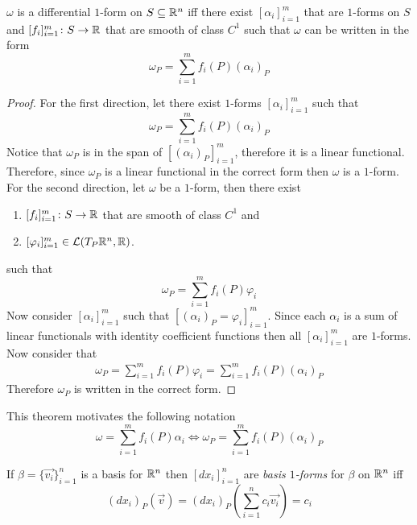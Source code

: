 \documentclass[notes.tex]{subfiles}
\begin{document}
\begin{theorem} \label{forms_are_sum_of_forms}
    $\omega$ is a differential $1$-form on $S \subseteq \mathbb{R}^n$ iff there exist $[\alpha_i]_{i = 1}^m$ that are $1$-forms on $S$ and $[f_i]_{i = 1}^m\colon S \to \mathbb{R}$ that are smooth of class $C^1$ such that $\omega$ can be written in the form
    \[
        \omega_P = \sum_{i = 1}^m f_i(P)(\alpha_i)_P
    \]
\end{theorem}
\begin{proof}
    For the first direction, let there exist $1$-forms $[\alpha_i]_{i = 1}^m$ such that
    \[
        \omega_P = \sum_{i = 1}^m f_i(P)(\alpha_i)_P
    \]
    Notice that $\omega_P$ is in the span of $[(\alpha_i)_P]_{i = 1}^m$, therefore it is a linear functional. Therefore, since $\omega_P$ is a linear functional in the correct form then $\omega$ is a $1$-form. \\
    For the second direction, let $\omega$ be a $1$-form, then there exist
    \begin{enumerate}[label = \arabic*)]
        \item $[f_i]_{i = 1}^m\colon S \to \mathbb{R}$ that are smooth of class $C^1$ and
        \item $[\varphi_i]_{i = 1}^m \in \mathcal{L}(T_P \mathbb{R}^n, \mathbb{R})$.
    \end{enumerate}
    such that
    \[
        \omega_P = \sum_{i = 1}^m f_i(P)\varphi_i
    \]
    Now consider $[\alpha_i]_{i = 1}^m$ such that $[(\alpha_i)_P = \varphi_i]_{i = 1}^m$. Since each $\alpha_i$ is a sum of linear functionals with identity coefficient functions then all $[\alpha_i]_{i = 1}^m$ are $1$-forms. Now consider that
    \begin{align*}
        \omega_P = \sum_{i = 1}^m f_i(P)\varphi_i = \sum_{i = 1}^m f_i(P)(\alpha_i)_P
    \end{align*}
    Therefore $\omega_P$ is written in the correct form.
\end{proof}

This theorem motivates the following notation
\[
    \omega = \sum_{i = 1}^m f_i(P)\alpha_i \iff \omega_P = \sum_{i = 1}^m f_i(P)(\alpha_i)_P
\]

\begin{definition}
    If $\beta = \{ \vec{v_i} \}_{i = 1}^n$ is a basis for $\mathbb{R}^n$ then $[dx_i]_{i = 1}^n$ are \textit{basis $1$-forms} for $\beta$ on $\mathbb{R}^n$ iff
    \[
        (dx_i)_P(\vec{v}) = (dx_i)_P\left( \sum_{i = 1}^n c_i\vec{v_i} \right) = c_i
    \]
\end{definition}
\end{document}
